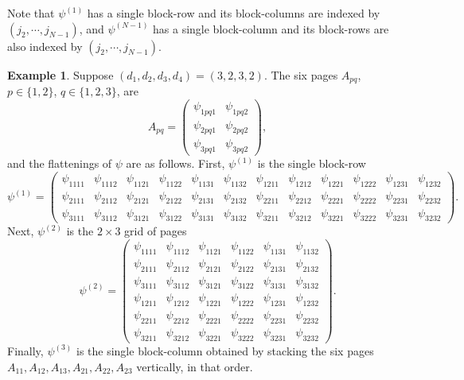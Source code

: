 \documentclass[12pt]{article}
\theoremstyle{definition}
\newtheorem{example}[theorem]{Example}
\numberwithin{theorem}{section}
\begin{document}
Note that $\psi^{(1)}$ has a single block-row and
its block-columns are indexed by $(j_2,\cdots,j_{N-1})$, and $\psi^{(N-1)}$ has  a single block-column
and its block-rows are also indexed by $(j_2, \cdots, j_{N-1})$. 
\begin{example}\label{ex:concrete-flattening}
Suppose $(d_1,d_2,d_3,d_4)=(3,2,3,2)$. The six pages $A_{pq}$, $p\in\{1,2\}$, $q\in\{1,2,3\}$, are
$$A_{pq} = \begin{pmatrix} \psi_{1pq1} & \psi_{1pq2} \\ \psi_{2pq1} & \psi_{2pq2} \\ \psi_{3pq1} & \psi_{3pq2}\end{pmatrix},$$
and the flattenings of $\psi$ are as follows. First, $\psi^{(1)}$ is the single block-row
$$
\psi^{(1)} = \left(\begin{array}{cc|cc|cc|cc|cc|cc}
\psi_{1111} & \psi_{1112} & \psi_{1121} & \psi_{1122} & \psi_{1131} & \psi_{1132} & \psi_{1211} & \psi_{1212} & \psi_{1221} & \psi_{1222} & \psi_{1231} & \psi_{1232} \\
\psi_{2111} & \psi_{2112} & \psi_{2121} & \psi_{2122} & \psi_{2131} & \psi_{2132} & \psi_{2211} & \psi_{2212} & \psi_{2221} & \psi_{2222} & \psi_{2231} & \psi_{2232} \\
\psi_{3111} & \psi_{3112} & \psi_{3121} & \psi_{3122} & \psi_{3131} & \psi_{3132} & \psi_{3211} & \psi_{3212} & \psi_{3221} & \psi_{3222} & \psi_{3231} & \psi_{3232}
\end{array}\right).
$$
Next, $\psi^{(2)}$ is the $2\times3$ grid of pages
$$
\psi^{(2)} = \left(\begin{array}{cc|cc|cc}
\psi_{1111} & \psi_{1112} & \psi_{1121} & \psi_{1122} & \psi_{1131} & \psi_{1132} \\
\psi_{2111} & \psi_{2112} & \psi_{2121} & \psi_{2122} & \psi_{2131} & \psi_{2132} \\
\psi_{3111} & \psi_{3112} & \psi_{3121} & \psi_{3122} & \psi_{3131} & \psi_{3132} \\ \hline
\psi_{1211} & \psi_{1212} & \psi_{1221} & \psi_{1222} & \psi_{1231} & \psi_{1232} \\
\psi_{2211} & \psi_{2212} & \psi_{2221} & \psi_{2222} & \psi_{2231} & \psi_{2232} \\
\psi_{3211} & \psi_{3212} & \psi_{3221} & \psi_{3222} & \psi_{3231} & \psi_{3232}
\end{array}\right).
$$
Finally, $\psi^{(3)}$ is the single block-column obtained by stacking the six pages $A_{11},A_{12},A_{13},A_{21},A_{22},A_{23}$ vertically, in that order. 
\end{example}
\end{document}
